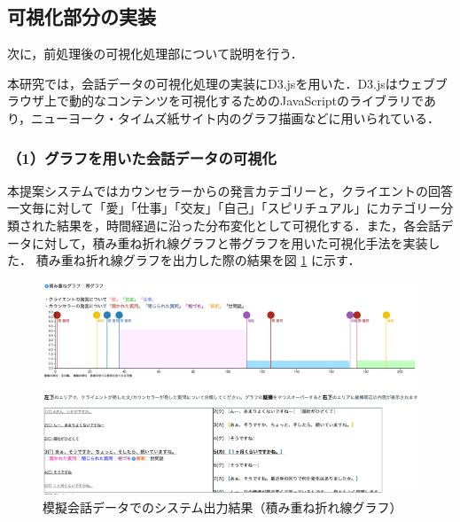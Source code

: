 \documentclass[shuuron]{kuee}
\begin{document}

\subsection{可視化部分の実装} %

次に，前処理後の可視化処理部について説明を行う．





本研究では，会話データの可視化処理の実装にD3.js\cite{vand3}を用いた．D3.jsはウェブブラウザ上で動的なコンテンツを可視化するためのJavaScriptのライブラリであり，ニューヨーク・タイムズ紙サイト内のグラフ描画などに用いられている．




\subsubsection{（1）グラフを用いた会話データの可視化}
本提案システムではカウンセラーからの発言カテゴリーと，クライエントの回答一文毎に対して「愛」「仕事」「交友」「自己」「スピリチュアル」にカテゴリー分類された結果を，時間経過に沿った分布変化として可視化する．また，各会話データに対して，積み重ね折れ線グラフと帯グラフを用いた可視化手法を実装した．
積み重ね折れ線グラフを出力した際の結果を図
\ref{fig:6_1}
に示す．
\begin{figure}
  \begin{center}
    \includegraphics[width=\linewidth]{6_1.png}
  \end{center}
  \caption{模擬会話データでのシステム出力結果（積み重ね折れ線グラフ）}
  \label{fig:6_1}
\end{figure}
\end{document}
